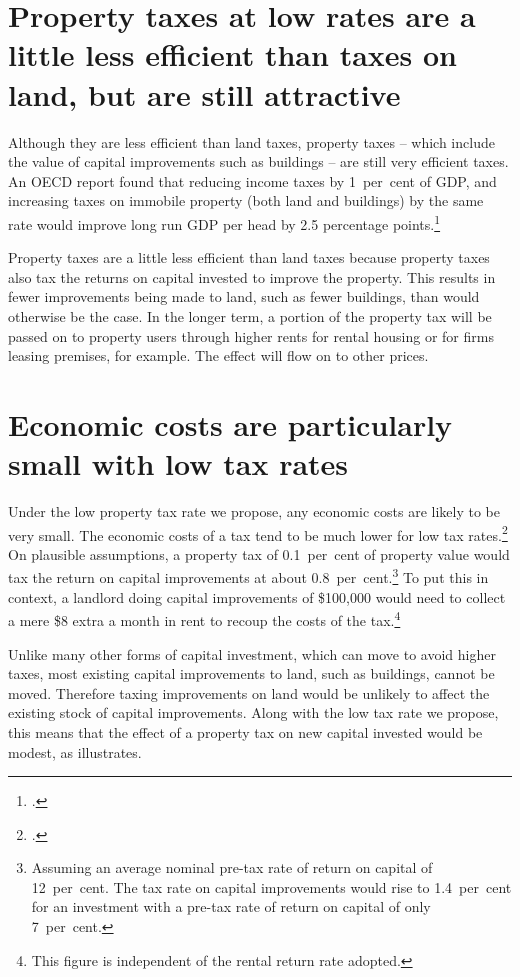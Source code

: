\documentclass[twoside,english]{Dianab5ona4portrait}
\begin{document}
\section{Property taxes at low rates are a little less efficient than taxes on land, but are still attractive\label{sec:PROP-4-2}}
Although they are less efficient than land taxes, property taxes -- which include the value of capital improvements such as buildings -- are still very efficient taxes. An OECD report found that reducing income taxes by 1~per~cent of GDP, and increasing taxes on immobile property (both land and buildings) by the same rate would improve long run GDP per head by 2.5 percentage points.\footcite[][58]{JohanssonHeadyArnoldEtAl2008}

Property taxes are a little less efficient than land taxes because property taxes also tax the returns on capital invested to improve the property. This results in fewer improvements being made to land, such as fewer buildings, than would otherwise be the case. In the longer term, a portion of the property tax will be passed on to property users through higher rents for rental housing or for firms leasing premises, for example. The effect will flow on to other prices.

\section{\label{sec:PROP-4-3}Economic costs are particularly small with low tax rates}
Under the low property tax rate we propose, any economic costs are likely to be very small. The economic costs of a tax tend to be much lower for low tax rates.\footcite[][18]{KPMGEconotech2011-GST}  On plausible assumptions, a property tax of 0.1~per~cent of property value would tax the return on capital improvements at about 0.8~per~cent.\footnote{Assuming an average nominal pre-tax rate of return on capital of 12~per~cent. The tax rate on capital improvements would rise to 1.4~per~cent for an investment with a pre-tax rate of return on capital of only 7~per~cent.}  To put this in context, a landlord doing capital improvements of \$100,000 would need to collect a mere \$8 extra a month in rent to recoup the costs of the tax.\footnote{This figure is independent of the rental return rate adopted.}

Unlike many other forms of capital investment, which can move to avoid higher taxes, most existing capital improvements to land, such as buildings, cannot be moved. Therefore taxing improvements on land would be unlikely to affect the existing stock of capital improvements. Along with the low tax rate we propose, this means that the effect of a property tax on new capital invested would be modest, as  illustrates.  
\end{document}
